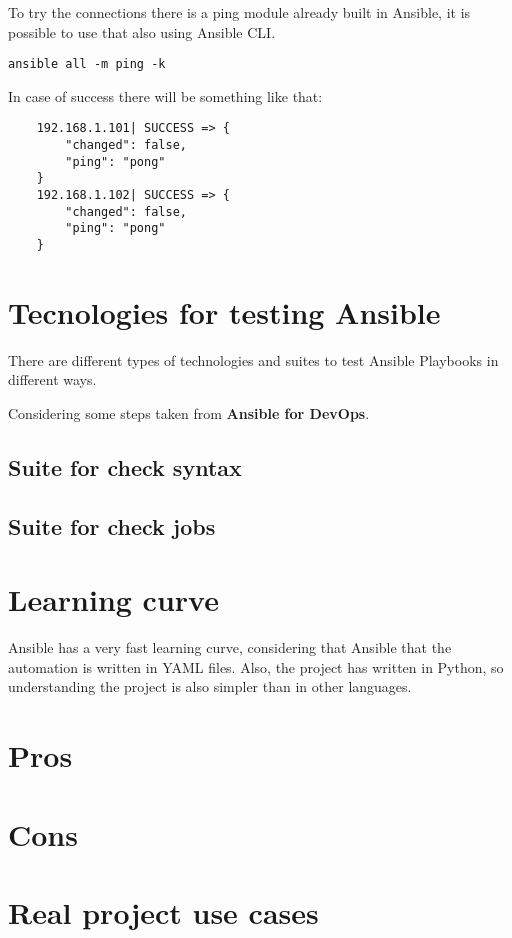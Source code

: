 \documentclass[12pt,a4paper,openright,twoside]{book}
\begin{document}
To try the connections there is a ping module already built in Ansible, it is possible to use that also using Ansible CLI.
\begin{lstlisting}
ansible all -m ping -k
\end{lstlisting}

In case of success there will be something like that:
\begin{lstlisting}
    192.168.1.101| SUCCESS => {
        "changed": false, 
        "ping": "pong"
    }
    192.168.1.102| SUCCESS => {
        "changed": false, 
        "ping": "pong"
    }
\end{lstlisting}

\section{Tecnologies for testing Ansible}
There are different types of technologies and suites to test Ansible Playbooks in different ways.


Considering some steps taken from \textbf{Ansible for DevOps}\cite{ansibleForDevOps}.

\subsection{Suite for check syntax}

\subsection{Suite for check jobs}

\section{Learning curve}
Ansible has a very fast learning curve, considering that Ansible that the automation is written in YAML files.
Also, the project has written in Python, so understanding the project is also simpler than in other languages.

\section{Pros}

\section{Cons}

\section{Real project use cases}
\end{document}
